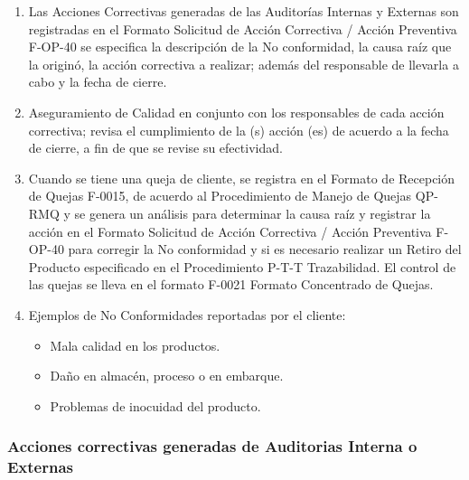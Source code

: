 \begin{enumerate}
	\item Las Acciones Correctivas generadas de las Auditorías Internas y Externas son registradas en el Formato Solicitud de Acción Correctiva / Acción Preventiva F-OP-40 se especifica la descripción de la No conformidad, la causa raíz que la originó, la acción correctiva a realizar; además del responsable de llevarla a cabo y la fecha de cierre.
	\item Aseguramiento de Calidad en conjunto con los responsables de cada acción correctiva; revisa el cumplimiento de la (s) acción (es) de acuerdo a la fecha de cierre, a fin de que se revise su efectividad.
	\item Cuando se tiene una queja de cliente, se registra en el Formato de Recepción de Quejas F-0015, de acuerdo al Procedimiento de Manejo de Quejas QP-RMQ y se genera un análisis para determinar la causa raíz y registrar la acción en el Formato Solicitud de Acción Correctiva / Acción Preventiva F-OP-40 para corregir la No conformidad y si es necesario realizar un Retiro del Producto especificado en el Procedimiento P-T-T Trazabilidad. El control de las quejas se lleva en el formato F-0021 Formato Concentrado de Quejas.
	\item Ejemplos de No Conformidades reportadas por el cliente:
	\begin{itemize}
		\item Mala calidad en los productos.
		\item Daño en almacén, proceso o en embarque.
		\item Problemas de inocuidad del producto.
	\end{itemize}
\end{enumerate}

\subsubsection{Acciones correctivas generadas de Auditorias Interna o Externas}

